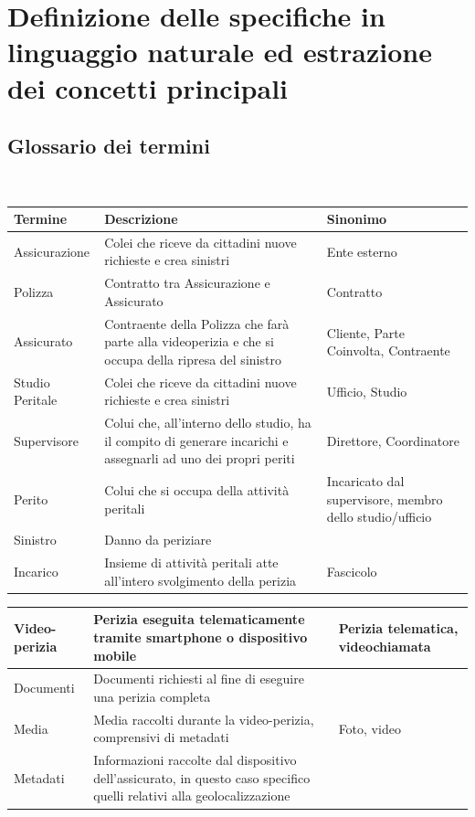 \documentclass[a4paper,12pt]{report}
\begin{document}
\section{Definizione delle specifiche in linguaggio naturale ed estrazione dei concetti principali}
\subsection{Glossario dei termini}
\mbox{}\\
\def\arraystretch{2}%
\begin{tabularx}{\textwidth}{ m{3cm} | m{6cm} | m{3cm}}
    \textbf{Termine} & \textbf{Descrizione} & \textbf{Sinonimo} \\
\hline
Assicurazione & Colei che riceve da cittadini nuove richieste e crea sinistri & Ente esterno\\ \hline
Polizza & Contratto tra Assicurazione e Assicurato & Contratto\\ \hline
Assicurato & Contraente della Polizza che farà parte alla videoperizia e che si occupa della ripresa del sinistro & Cliente, Parte Coinvolta, Contraente\\ \hline
Studio Peritale & Colei che riceve da cittadini nuove richieste e crea sinistri & Ufficio, Studio\\ \hline
Supervisore & Colui che, all’interno dello studio, ha il compito di generare incarichi e assegnarli ad uno dei propri periti & Direttore, Coordinatore\\ \hline
Perito & Colui che si occupa della attività peritali & Incaricato dal supervisore, membro dello studio/ufficio\\ \hline
Sinistro & Danno da periziare & \\ \hline
Incarico & Insieme di attività peritali atte all’intero svolgimento della perizia & Fascicolo\\
\end{tabularx}
\noindent
\def\arraystretch{2}%
\begin{tabularx}{\textwidth}{ m{3cm} | m{6cm} | m{3cm}}
Video-perizia & Perizia eseguita telematicamente tramite smartphone o dispositivo mobile & Perizia telematica, videochiamata \\ \hline
Documenti & Documenti richiesti al fine di eseguire una perizia completa & \\ \hline
Media & Media raccolti durante la video-perizia, comprensivi di metadati & Foto, video\\ \hline
Metadati & Informazioni raccolte dal dispositivo dell’assicurato, in questo caso specifico quelli relativi alla geolocalizzazione & \\
\end{tabularx}
\\
\\
\end{document}
